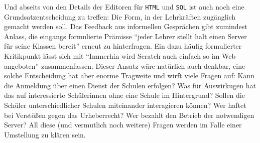 Und abseits von den Details der Editoren für \texttt{HTML} und \texttt{SQL} ist auch noch eine Grundsatzentscheidung zu treffen: Die Form, in der \idename{} Lehrkräften zugänglich gemacht werden soll. Das Feedback aus informellen Gesprächen gibt zumindest Anlass, die eingangs formulierte Prämisse "`jeder Lehrer stellt halt einen Server für seine Klassen bereit"' erneut zu hinterfragen. Ein dazu häufig formulierter Kritikpunkt lässt sich mit "`Immerhin wird Scratch auch einfach so im Web angeboten"' zusammenfassen. Dieser Ansatz wäre natürlich auch denkbar, eine solche Entscheidung hat aber enorme Tragweite und wirft viele Fragen auf: Kann die Anmeldung über einen Dienst der Schulen erfolgen? Was für Auswirkugen hat das auf interessierte Schülerinnen ohne eine Schule im Hintergrund? Sollen die Schüler unterschiedlicher Schulen miteinander interagieren können? Wer haftet bei Verstößen gegen das Urheberrecht? Wer bezahlt den Betrieb der notwendigen Server? All diese (und vermutlich noch weitere) Fragen werden im Falle einer Umstellung zu klären sein.




